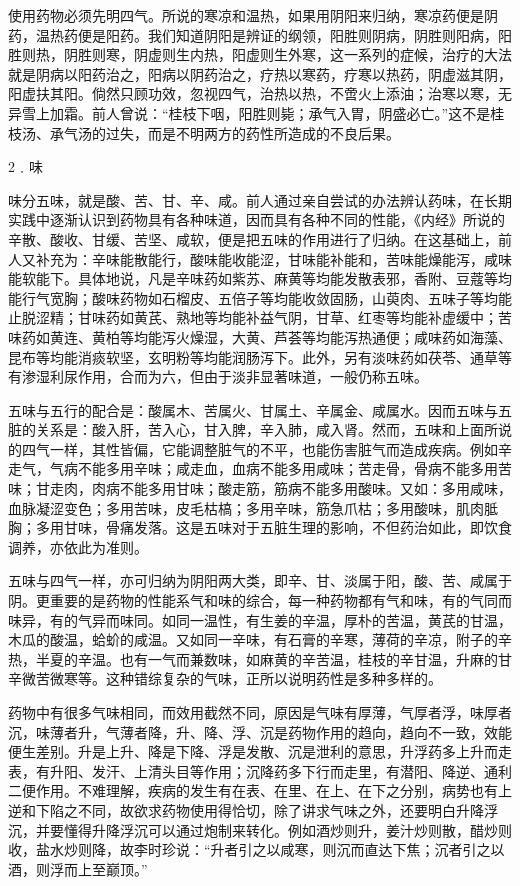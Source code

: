 \documentclass[a4paper,12pt,UTF8,twoside]{ctexbook}
\begin{document}
使用药物必须先明四气。所说的寒凉和温热，如果用阴阳来归纳，寒凉药便是阴药，温热药便是阳药。我们知道阴阳是辨证的纲领，阳胜则阴病，阴胜则阳病，阳胜则热，阴胜则寒，阴虚则生内热，阳虚则生外寒，这一系列的症候，治疗的大法就是阴病以阳药治之，阳病以阴药治之，疗热以寒药，疗寒以热药，阴虚滋其阴，阳虚扶其阳。倘然只顾功效，忽视四气，治热以热，不啻火上添油；治寒以寒，无异雪上加霜。前人曾说：“桂枝下咽，阳胜则毙；承气入胃，阴盛必亡。”这不是桂枝汤、承气汤的过失，而是不明两方的药性所造成的不良后果。

2﹒味

味分五味，就是酸、苦、甘、辛、咸。前人通过亲自尝试的办法辨认药味，在长期实践中逐渐认识到药物具有各种味道，因而具有各种不同的性能，《内经》所说的辛散、酸收、甘缓、苦坚、咸软，便是把五味的作用进行了归纳。在这基础上，前人又补充为：辛味能散能行，酸味能收能涩，甘味能补能和，苦味能燥能泻，咸味能软能下。具体地说，凡是辛味药如紫苏、麻黄等均能发散表邪，香附、豆蔻等均能行气宽胸；酸味药物如石榴皮、五倍子等均能收敛固肠，山萸肉、五味子等均能止脱涩精；甘味药如黄芪、熟地等均能补益气阴，甘草、红枣等均能补虚缓中；苦味药如黄连、黄柏等均能泻火燥湿，大黄、芦荟等均能泻热通便；咸味药如海藻、昆布等均能消痰软坚，玄明粉等均能润肠泻下。此外，另有淡味药如茯苓、通草等有渗湿利尿作用，合而为六，但由于淡非显著味道，一般仍称五味。

五味与五行的配合是：酸属木、苦属火、甘属土、辛属金、咸属水。因而五味与五脏的关系是：酸入肝，苦入心，甘入脾，辛入肺，咸入肾。然而，五味和上面所说的四气一样，其性皆偏，它能调整脏气的不平，也能伤害脏气而造成疾病。例如辛走气，气病不能多用辛味；咸走血，血病不能多用咸味；苦走骨，骨病不能多用苦味；甘走肉，肉病不能多用甘味；酸走筋，筋病不能多用酸味。又如：多用咸味，血脉凝涩变色；多用苦味，皮毛枯槁；多用辛味，筋急爪枯；多用酸味，肌肉胝胸；多用甘味，骨痛发落。这是五味对于五脏生理的影响，不但药治如此，即饮食调养，亦依此为准则。

五味与四气一样，亦可归纳为阴阳两大类，即辛、甘、淡属于阳，酸、苦、咸属于阴。更重要的是药物的性能系气和味的综合，每一种药物都有气和味，有的气同而味异，有的气异而味同。如同一温性，有生姜的辛温，厚朴的苦温，黄芪的甘温，木瓜的酸温，蛤蚧的咸温。又如同一辛味，有石膏的辛寒，薄荷的辛凉，附子的辛热，半夏的辛温。也有一气而兼数味，如麻黄的辛苦温，桂枝的辛甘温，升麻的甘辛微苦微寒等。这种错综复杂的气味，正所以说明药性是多种多样的。

药物中有很多气味相同，而效用截然不同，原因是气味有厚薄，气厚者浮，味厚者沉，味薄者升，气薄者降，升、降、浮、沉是药物作用的趋向，趋向不一致，效能便生差别。升是上升、降是下降、浮是发散、沉是泄利的意思，升浮药多上升而走表，有升阳、发汗、上清头目等作用；沉降药多下行而走里，有潜阳、降逆、通利二便作用。不难理解，疾病的发生有在表、在里、在上、在下之分别，病势也有上逆和下陷之不同，故欲求药物使用得恰切，除了讲求气味之外，还要明白升降浮沉，并要懂得升降浮沉可以通过炮制来转化。例如酒炒则升，姜汁炒则散，醋炒则收，盐水炒则降，故李时珍说：“升者引之以咸寒，则沉而直达下焦；沉者引之以酒，则浮而上至巅顶。”
\end{document}
